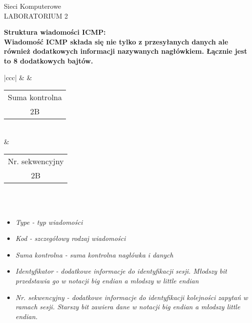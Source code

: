 \documentclass[a4paper,12pt]{article}
\newcommand{\h}[1]{\noindent \bf #1 \rm \\ \noindent}
\newcommand{\italic}[1]{\it #1 \rm}
\begin{document}
\begin{center}
	\LARGE
	Sieci Komputerowe \\
	\large
	LABORATORIUM 2 
\end{center}
\vspace{1cm}

\h{Struktura wiadomości ICMP:}
Wiadomość ICMP składa się nie tylko z przesyłanych danych ale również dodatkowych informacji nazywanych nagłówkiem. Łącznie jest to 8 dodatkowych bajtów.
\begin{table}[H]
	\centering
	\begin{tabular}{|ccc|}
		\hline
		 &  & \begin{tabular}[c]{@{}c@{}}Suma kontrolna\\ 2B\end{tabular}  \\ \hline
		                                                               & \begin{tabular}[c]{@{}c@{}}Nr. sekwencyjny\\ 2B\end{tabular} \\ \hline
		                                                                                                                                    \\ \hline
	\end{tabular}
\end{table}

\begin{itemize}
	\item \italic{Type} - typ wiadomości
	\item \italic{Kod} - szczegółowy rodzaj wiadomości
	\item \italic{Suma kontrolna} - suma kontrolna nagłówka i danych
	\item \italic{Identyfikator} - dodatkowe informacje do identyfikacji sesji. Młodszy bit przedstawia go w notacji big endian a młodszy w little endian
	\item \italic{Nr. sekwencyjny} - dodatkowe informacje do identyfikacji kolejności zapytań w ramach sesji. Starszy bit zawiera dane w notacji big endian a młodszy little endian.
\end{itemize}
\vspace{5mm}
\end{document}
